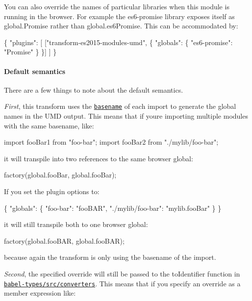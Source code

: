 You can also override the names of particular libraries when this module is running in the browser. For example the {\ttfamily es6-\/promise} library exposes itself as {\ttfamily global.\+Promise} rather than {\ttfamily global.\+es6\+Promise}. This can be accommodated by\+:


\begin{DoxyCode}
\{
  "plugins": [
    ["transform-es2015-modules-umd", \{
      "globals": \{
        "es6-promise": "Promise"
      \}
    \}]
  ]
\}
\end{DoxyCode}


\paragraph*{Default semantics}

There are a few things to note about the default semantics.

{\itshape First}, this transform uses the \href{https://en.wikipedia.org/wiki/Basename}{\tt basename} of each import to generate the global names in the U\+MD output. This means that if you\textquotesingle{}re importing multiple modules with the same basename, like\+:


\begin{DoxyCode}
import fooBar1 from "foo-bar";
import fooBar2 from "./mylib/foo-bar";
\end{DoxyCode}


it will transpile into two references to the same browser global\+:


\begin{DoxyCode}
factory(global.fooBar, global.fooBar);
\end{DoxyCode}


If you set the plugin options to\+:


\begin{DoxyCode}
\{
  "globals": \{
    "foo-bar": "fooBAR",
    "./mylib/foo-bar": "mylib.fooBar"
  \}
\}
\end{DoxyCode}


it will still transpile both to one browser global\+:


\begin{DoxyCode}
factory(global.fooBAR, global.fooBAR);
\end{DoxyCode}


because again the transform is only using the basename of the import.

{\itshape Second}, the specified override will still be passed to the {\ttfamily to\+Identifier} function in \href{https://github.com/babel/babel/blob/master/packages/babel-types/src/converters.js}{\tt babel-\/types/src/converters}. This means that if you specify an override as a member expression like\+:


